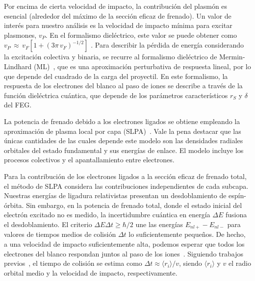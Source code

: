 Por encima de cierta velocidad de impacto, la contribución del plasmón 
es esencial (alrededor del máximo de la sección eficaz de frenado). Un 
valor de interés para nuestro análisis es la velocidad de impacto mínima 
para excitar plasmones, $v_P$. En el formalismo dieléctrico, este valor 
se puede obtener como $v_P\,\approx\,v_F[1+(3\pi\,v_F)^{-1/2}]$
\cite{suppression}. Para describir la pérdida de energía considerando la 
excitación colectiva y binaria, se recurre al formalismo dieléctrico de 
Mermin-Lindhard (ML)~\cite{Mermin:70}, que es una aproximación 
perturbativa de respuesta lineal, por lo que depende del cuadrado de la 
carga del proyectil. En este formalismo, la respuesta de los electrones 
del blanco al paso de iones se describe a través de la función 
dieléctrica cuántica, que depende de los parámetros característicos 
$r_S$ y $\delta$ del FEG.

La potencia de frenado debido a los electrones ligados se obtiene 
empleando la aproximación de plasma local por capa 
(SLPA)~\cite{Montanari:17,Montanari:13}. Vale la pena destacar que las 
únicas cantidades de las cuales depende este modelo son las densidades 
radiales orbitales del estado fundamental y sus energías de enlace. El 
modelo incluye los procesos colectivos y el apantallamiento entre 
electrones. 

Para la contribución de los electrones ligados a la sección eficaz de 
frenado total, el método de SLPA considera las contribuciones 
independientes de cada subcapa. Nuestras energías de ligadura 
relativistas presentan un desdoblamiento de espín-órbita. Sin embargo, 
en la potencia de frenado total, donde el estado inicial del electrón 
excitado no es medido, la incertidumbre cuántica en energía $\Delta E$ 
fusiona el desdoblamiento. El criterio $\Delta E\Delta t\geq\hbar/2$ une 
las energías $E_{nl+}-E_{nl-}$ para valores de tiempos medios de colisión
$\Delta t$ lo suficientemente pequeños. De hecho, a una velocidad de 
impacto suficientemente alta, podemos esperar que todos los electrones 
del blanco respondan juntos al paso de los 
iones~\cite{Lindhard:53,Chu:72}. Siguiendo trabajos 
previos~\cite{Montanari:09}, el tiempo de colisión se estima como 
$\Delta t\approx\langle r_i\rangle/v$, siendo $\langle r_i\rangle$ y $v$ 
el radio orbital medio y la velocidad de impacto, respectivamente. 

